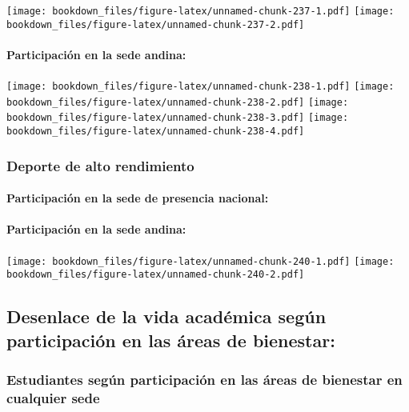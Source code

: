 \documentclass[]{article}
\let\oldparagraph\paragraph
\renewcommand{\paragraph}[1]{\oldparagraph{#1}\mbox{}}
\theoremstyle{definition}
\theoremstyle{definition}
\theoremstyle{definition}
\theoremstyle{remark}
\begin{document}
\texttt{[image: bookdown\_files/figure-latex/unnamed-chunk-237-1.pdf]}
\texttt{[image: bookdown\_files/figure-latex/unnamed-chunk-237-2.pdf]}

\paragraph{Participación en la sede
andina:}\label{participacion-en-la-sede-andina-31}

\texttt{[image: bookdown\_files/figure-latex/unnamed-chunk-238-1.pdf]}
\texttt{[image: bookdown\_files/figure-latex/unnamed-chunk-238-2.pdf]}
\texttt{[image: bookdown\_files/figure-latex/unnamed-chunk-238-3.pdf]}
\texttt{[image: bookdown\_files/figure-latex/unnamed-chunk-238-4.pdf]}

\subsubsection{Deporte de alto
rendimiento}\label{deporte-de-alto-rendimiento-1}

\paragraph{Participación en la sede de presencia
nacional:}\label{participacion-en-la-sede-de-presencia-nacional-32}

\paragraph{Participación en la sede
andina:}\label{participacion-en-la-sede-andina-32}

\texttt{[image: bookdown\_files/figure-latex/unnamed-chunk-240-1.pdf]}
\texttt{[image: bookdown\_files/figure-latex/unnamed-chunk-240-2.pdf]}

\subsection{Desenlace de la vida académica según participación en las
áreas de
bienestar:}\label{desenlace-de-la-vida-academica-segun-participacion-en-las-areas-de-bienestar}

\subsubsection{Estudiantes según participación en las áreas de bienestar
en cualquier
sede}\label{estudiantes-segun-participacion-en-las-areas-de-bienestar-en-cualquier-sede}
\end{document}
